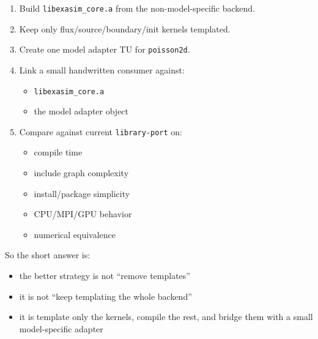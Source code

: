 \documentclass[11pt]{article}
\begin{document}
\begin{enumerate}[leftmargin=*]
\item Build \texttt{libexasim\_core.a} from the non-model-specific backend.
\item Keep only flux/source/boundary/init kernels templated.
\item Create one model adapter TU for \texttt{poisson2d}.
\item Link a small handwritten consumer against:
\begin{itemize}[leftmargin=*]
\item \texttt{libexasim\_core.a}
\item the model adapter object
\end{itemize}
\item Compare against current \texttt{library-port} on:
\begin{itemize}[leftmargin=*]
\item compile time
\item include graph complexity
\item install/package simplicity
\item CPU/MPI/GPU behavior
\item numerical equivalence
\end{itemize}
\end{enumerate}

So the short answer is:

\begin{itemize}[leftmargin=*]
\item the better strategy is not ``remove templates''
\item it is not ``keep templating the whole backend''
\item it is template only the kernels, compile the rest, and bridge them with a small model-specific adapter
\end{itemize}
\end{document}
